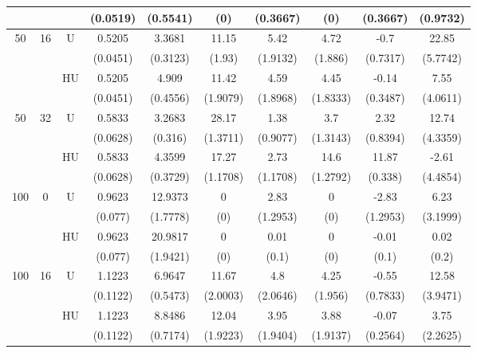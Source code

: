 \documentclass[11pt,a4paper]{article}
\begin{document}
\begin{table}[h!]
\begin{tabular}{|c|c|c|c|c|c|c|c|c|c|}
& & & (0.0519) & (0.5541) & (0) & (0.3667) & (0) & (0.3667) & (0.9732) \\
\hline %
50 & 16 & U&0.5205 & 3.3681 & 11.15 & 5.42 & 4.72 & -0.7 & 22.85  \\	
& & & (0.0451) & (0.3123) & (1.93) & (1.9132) & (1.886) & (0.7317) & (5.7742) \\
 &  &HU &0.5205 & 4.909 & 11.42 & 4.59 & 4.45 & -0.14 & 7.55  \\
& & & (0.0451) & (0.4556) & (1.9079) & (1.8968) & (1.8333) & (0.3487) & (4.0611) \\
\hline %
50 & 32 & U& 0.5833 & 3.2683 & 28.17 & 1.38 & 3.7 & 2.32 & 12.74  \\
& & & (0.0628) & (0.316) & (1.3711) & (0.9077) & (1.3143) & (0.8394) & (4.3359) \\
 &  &HU &0.5833 & 4.3599 & 17.27 & 2.73 & 14.6 & 11.87 & -2.61  \\
& & & (0.0628) & (0.3729) & (1.1708) & (1.1708) & (1.2792) & (0.338) & (4.4854) \\
\hline
\hline %
100 & 0 & U& 0.9623 & 12.9373 & 0 & 2.83 & 0 & -2.83 & 6.23  \\
& & & (0.077) & (1.7778) & (0) & (1.2953) & (0) & (1.2953) & (3.1999) \\
 &  &HU & 0.9623 & 20.9817 & 0 & 0.01 & 0 & -0.01 & 0.02  \\
& & & (0.077) & (1.9421) & (0) & (0.1) & (0) & (0.1) & (0.2) \\
\hline %
100 & 16 & U& 1.1223 & 6.9647 & 11.67 & 4.8 & 4.25 & -0.55 & 12.58  \\
& & & (0.1122) & (0.5473) & (2.0003) & (2.0646) & (1.956) & (0.7833) & (3.9471) \\
 &  &HU & 1.1223 & 8.8486 & 12.04 & 3.95 & 3.88 & -0.07 & 3.75  \\
& & & (0.1122) & (0.7174) & (1.9223) & (1.9404) & (1.9137) & (0.2564) & (2.2625) \\
\hline %

\end{tabular}
\end{table}
\end{document}
